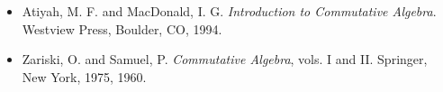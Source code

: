 {\small
 
\begin{itemize}
 
\item[{\bf [1]}] %
Atiyah, M. F.  and MacDonald, I. G. {\it Introduction to
Commutative Algebra}. Westview Press, Boulder, CO, 1994.
 


\item[{\bf [2]}] %
Zariski, O. and Samuel, P. {\it Commutative Algebra}, vols. I
and II. Springer, New York, 1975, 1960. 
 
\end{itemize}
}
 
\sagesection
 

